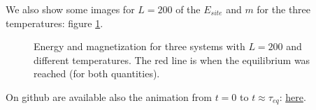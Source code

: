 \documentclass[../main.tex]{subfiles}
\begin{document}
We also show some images for $L=200$ of the $E_{site}$ and $m$ for the three temperatures: figure \ref{fig: ex_5}.

\begin{figure}[!ht]
    \centering
    \begin{subfigure}{.45\textwidth}
        \centering
        
    \end{subfigure}
    \begin{subfigure}{.45\textwidth}
        \centering
        
    \end{subfigure}
    \begin{subfigure}{.45\textwidth}
        \centering
        
    \end{subfigure}
    \caption{Energy and magnetization for three systems with $L=200$ and different temperatures. The red line is when the equilibrium was reached (for both quantities).}
    \label{fig: ex_5}
\end{figure}

On github are available also the animation from $t=0$ to $t\approx \tau_{eq}$: \href{https://github.com/EmanueleSarte/nmsm/tree/main/ex5}{here}.
\end{document}
